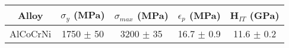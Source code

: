\documentclass{article}
\begin{document}
\begin{center}
 \begin{tabular}{c c c c c} 
 \hline
 Alloy & $\sigma_y$ (MPa) & $\sigma_{max}$ (MPa) & $\epsilon_p$ (MPa) & H$_{IT}$ (GPa)\\
 \hline
 AlCoCrNi & 1750 $\pm$ 50 & 3200 $\pm$ 35 & 16.7 $\pm$ 0.9 &  11.6 $\pm$ 0.2\\ 
 \hline
\end{tabular}
\end{center}
\end{document}

